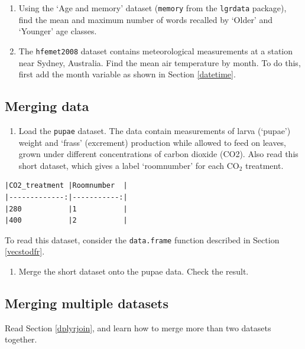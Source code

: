 \documentclass[]{book}
\providecommand{\tightlist}{%
  \setlength{\itemsep}{0pt}\setlength{\parskip}{0pt}}
\begin{document}
\begin{enumerate}
\def\labelenumi{\arabic{enumi}.}
\item
  Using the `Age and memory' dataset (\texttt{memory} from the \texttt{lgrdata} package), find the mean and maximum number of words recalled by `Older' and `Younger' age classes.
\item
  The \texttt{hfemet2008} dataset contains meteorological measurements at a station near Sydney, Australia. Find the mean air temperature by month. To do this, first add the month variable as shown in Section \ref{datetime}.
\end{enumerate}

\hypertarget{merging-data}{%
\subsection{Merging data}\label{merging-data}}

\begin{enumerate}
\def\labelenumi{\arabic{enumi}.}
\tightlist
\item
  Load the \texttt{pupae} dataset. The data contain measurements of larva (`pupae') weight and `frass' (excrement) production while allowed to feed on leaves, grown under different concentrations of carbon dioxide (CO2). Also read this short dataset, which gives a label `roomnumber' for each CO\(_2\) treatment.
\end{enumerate}

\begin{verbatim}
|CO2_treatment |Roomnumber  |
|-------------:|-----------:|
|280           |1           |
|400           |2           |
\end{verbatim}

To read this dataset, consider the \texttt{data.frame} function described in Section \ref{vecstodfr}.

\begin{enumerate}
\def\labelenumi{\arabic{enumi}.}
\tightlist
\item
  Merge the short dataset onto the pupae data. Check the result.
\end{enumerate}

\hypertarget{merging-multiple-datasets}{%
\subsection{Merging multiple datasets}\label{merging-multiple-datasets}}

Read Section \ref{dplyrjoin}, and learn how to merge more than two datasets together.
\end{document}
